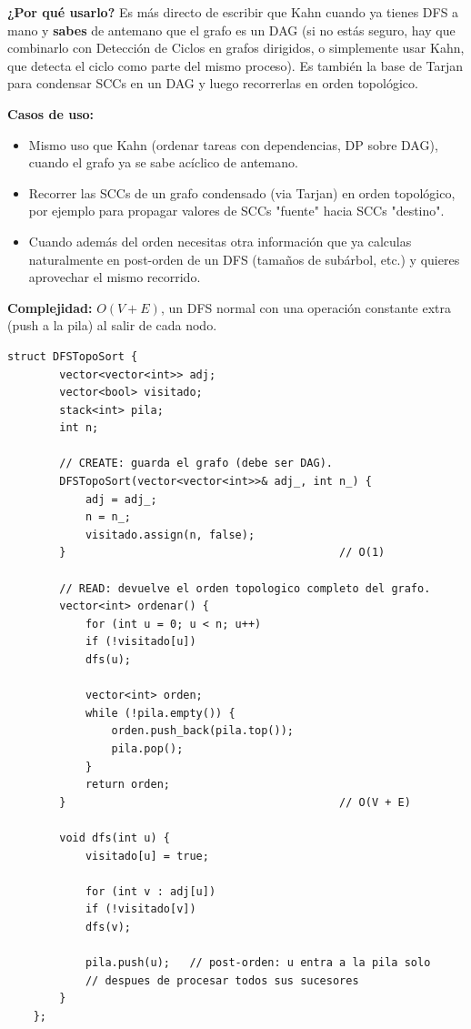 \documentclass[10pt,a4paper,twocolumn]{article}
\begin{document}
\textbf{¿Por qué usarlo?} Es más directo de escribir que Kahn cuando
ya tienes DFS a mano y \textbf{sabes} de antemano que el grafo es un
DAG (si no estás seguro, hay que combinarlo con Detección de Ciclos
en grafos dirigidos, o simplemente usar Kahn, que detecta el ciclo
como parte del mismo proceso). Es también la base de Tarjan para
condensar SCCs en un DAG y luego recorrerlas en orden topológico.

\textbf{Casos de uso:}

\begin{itemize}
	\item Mismo uso que Kahn (ordenar tareas con dependencias, DP
	sobre DAG), cuando el grafo ya se sabe acíclico de antemano.
	\item Recorrer las SCCs de un grafo condensado (via Tarjan) en
	orden topológico, por ejemplo para propagar valores de SCCs
	"fuente" hacia SCCs "destino".
	\item Cuando además del orden necesitas otra información que
	ya calculas naturalmente en post-orden de un DFS (tamaños de
	subárbol, etc.) y quieres aprovechar el mismo recorrido.
\end{itemize}

\textbf{Complejidad:} $O(V + E)$, un DFS normal con una operación
constante extra (push a la pila) al salir de cada nodo.

\begin{lstlisting}[style=cpp]
	struct DFSTopoSort {
		vector<vector<int>> adj;
		vector<bool> visitado;
		stack<int> pila;
		int n;
		
		// CREATE: guarda el grafo (debe ser DAG).
		DFSTopoSort(vector<vector<int>>& adj_, int n_) {
			adj = adj_;
			n = n_;
			visitado.assign(n, false);
		}                                          // O(1)
		
		// READ: devuelve el orden topologico completo del grafo.
		vector<int> ordenar() {
			for (int u = 0; u < n; u++)
			if (!visitado[u])
			dfs(u);
			
			vector<int> orden;
			while (!pila.empty()) {
				orden.push_back(pila.top());
				pila.pop();
			}
			return orden;
		}                                          // O(V + E)
		
		void dfs(int u) {
			visitado[u] = true;
			
			for (int v : adj[u])
			if (!visitado[v])
			dfs(v);
			
			pila.push(u);   // post-orden: u entra a la pila solo
			// despues de procesar todos sus sucesores
		}
	};
\end{lstlisting}
\end{document}
